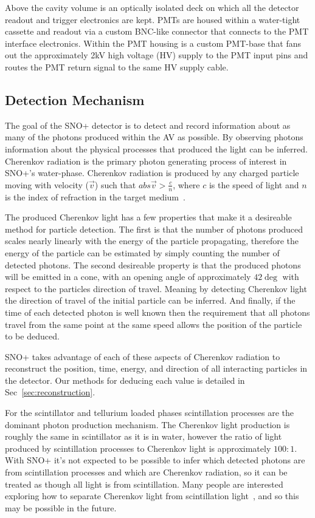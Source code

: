Above the cavity volume is an optically isolated deck on which all the detector
readout and trigger electronics are kept.
PMTs are housed within a water-tight cassette and readout via a custom BNC-like
connector that connects to the PMT interface electronics.
Within the PMT housing is a custom PMT-base that fans out the approximately 2kV
high voltage (HV) supply to the PMT input pins and routes the PMT return signal to the same
HV supply cable.


\subsection{Detection Mechanism}
The goal of the SNO+ detector is to detect and record information about as
many of the photons produced within the AV as possible.
By observing photons information about the physical processes that produced
the light can be inferred.
Cherenkov radiation is the primary photon generating process of interest in
SNO+'s water-phase.
Cherenkov radiation is produced by any charged particle moving with
velocity ($\vec{v}$) such that $abs{\vec{v}} > \frac{c}{n}$, where $c$ is the speed
of light and $n$ is the index of refraction in the target medium~\cite{cherenkov}.

The produced Cherenkov light has a few properties that make it a desireable
method for particle detection.
The first is that the number of photons produced scales nearly linearly
with the energy of the particle propagating, therefore the energy of the particle
can be estimated by simply counting the number of detected photons.
The second desireable property is that the produced photons will be
emitted in a cone, with an opening angle of approximately $42\deg$ with
respect to the particles direction of travel.
Meaning by detecting Cherenkov light the direction of travel of the initial
particle can be inferred.
And finally, if the time of each detected photon is well known then
the requirement that all photons travel from the same point at the same speed
allows the position of the particle to be deduced.

SNO+ takes advantage of each of these aspects of Cherenkov radiation to reconstruct
the position, time, energy, and direction of all interacting particles in the
detector.
Our methods for deducing each value is detailed in Sec~\ref{sec:reconstruction}.

For the scintillator and tellurium loaded phases scintillation processes are
the dominant photon production mechanism.
The Cherenkov light production is roughly the same in scintillator as it is in
water, however the ratio of light produced by scintillation processes to Cherenkov
light is approximately $100:1$.
With SNO+ it's not expected to be possible to infer which detected photons are
from scintillation processes and which are Cherenkov radiation, so it can be treated
as though all light is from scintillation.
Many people are interested exploring how to separate Cherenkov light from scintillation
light~\cite{XXX}, and so this may be possible in the future.

